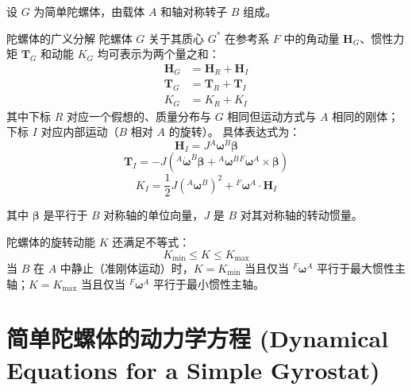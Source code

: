 设 \(G\) 为简单陀螺体，由载体 \(A\) 和轴对称转子 \(B\) 组成。
\begin{myTheorem}{陀螺体的广义分解}
陀螺体 \(G\) 关于其质心 \(G^*\) 在参考系 \(F\) 中的角动量 \(\mathbf{H}_G\)、惯性力矩 \(\mathbf{T}_G\) 和动能 \(K_G\) 均可表示为两个量之和：
\begin{align}
\mathbf{H}_G &= \mathbf{H}_R + \mathbf{H}_I \tag{1} \\
\mathbf{T}_G &= \mathbf{T}_R + \mathbf{T}_I \tag{2} \\
K_G &= K_R + K_I \tag{3}
\end{align}
其中下标 \(R\) 对应一个假想的、质量分布与 \(G\) 相同但运动方式与 \(A\) 相同的刚体；下标 \(I\) 对应内部运动（\(B\) 相对 \(A\) 的旋转）。
具体表达式为：
\begin{equation}
\mathbf{H}_I = J {}^A\boldsymbol{\omega}^B \boldsymbol{\beta} \tag{4}
\end{equation}
\begin{equation}
\mathbf{T}_I = -J({}^A\dot{\boldsymbol{\omega}}^B\boldsymbol{\beta} + {}^A\boldsymbol{\omega}^B {}^F\boldsymbol{\omega}^A \times \boldsymbol{\beta}) \tag{5}
\end{equation}
\begin{equation}
K_I = \frac{1}{2}J({}^A\boldsymbol{\omega}^B)^2 + {}^F\boldsymbol{\omega}^A \cdot \mathbf{H}_I \tag{6}
\end{equation}
\end{myTheorem}
其中 \(\boldsymbol{\beta}\) 是平行于 \(B\) 对称轴的单位向量，\(J\) 是 \(B\) 对其对称轴的转动惯量。

陀螺体的旋转动能 \(K\) 还满足不等式：
\begin{equation}
K_{\min} \le K \le K_{\max} \tag{8}
\end{equation}
当 \(B\) 在 \(A\) 中静止（准刚体运动）时，\(K = K_{\min}\) 当且仅当 \(^F\boldsymbol{\omega}^A\) 平行于最大惯性主轴；\(K = K_{\max}\) 当且仅当 \(^F\boldsymbol{\omega}^A\) 平行于最小惯性主轴。

\section{简单陀螺体的动力学方程 (Dynamical Equations for a Simple Gyrostat)}

